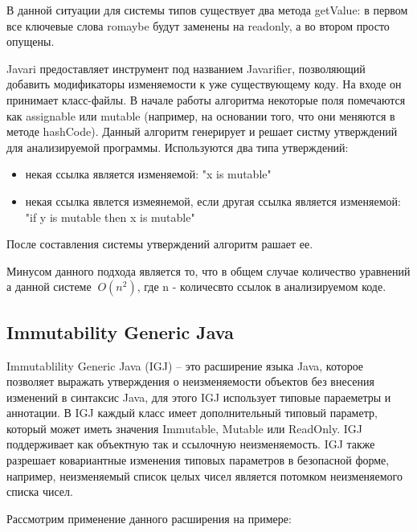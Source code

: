 В данной ситуации для системы типов существует два метода getValue: в первом все ключевые слова romaybe будут заменены на readonly, а во втором просто опущены. 

Javari предоставляет инструмент под названием Javarifier, позволяющий добавить модификаторы изменяемости к уже существующему коду. На входе он принимает класс-файлы. В начале работы алгоритма некоторые поля помечаются как assignable или mutable (например, на основании того, что они меняются в методе hashCode). Данный алгоритм генерирует и решает систму утверждений для анализируемой программы. Используются два типа утверждений:
\begin{itemize}
	
	\item некая ссылка является изменяемой: "x is mutable"
	
	\item некая ссылка явлется измеянемой, если другая ссылка является изменяемой: "if y is mutable then x is mutable"
	
\end{itemize}
После составления системы утверждений алгоритм рашает ее.

Минусом данного подхода является то, что в общем случае количество уравнений а данной системе $~O(n^2)$, где n - количесвто ссылок в анализируемом коде. 

\subsection{Immutability Generic Java}

Immutablility Generic Java (IGJ) \cite{Zibin2007} -- это расширение языка Java, которое позволяет выражать утверждения о неизменяемости объектов без внесения изменений в синтаксис Java, для этого IGJ использует типовые параеметры и аннотации. В IGJ каждый класс имеет дополнительный типовый параметр, который может иметь значения Immutable, Mutable или ReadOnly. IGJ поддерживает как объектную так и ссылочную неизменяемость. IGJ также разрешает ковариантные изменения типовых параметров в безопасной форме, например, неизменяемый список целых чисел является потомком неизменяемого списка чисел.

Рассмотрим применение данного расширения на примере:

